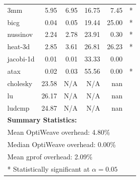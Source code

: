 \begin{table}[h]
\begin{tabular}{lrrrrl}
3mm                  &   5.95 &   6.95 &  16.75 &   7.45 & * \\
bicg                 &   0.04 &   0.05 &  19.44 &  25.00 & * \\
nussinov             &   2.24 &   2.78 &  23.91 &   0.30 & * \\
heat-3d              &   2.85 &   3.61 &  26.81 &  26.23 & * \\
jacobi-1d            &   0.01 &   0.01 &  33.33 &   0.00 &   \\
atax                 &   0.02 &   0.03 &  55.56 &   0.00 & * \\
cholesky             &  23.58 &    N/A &    N/A &    nan &   \\
lu                   &  26.17 &    N/A &    N/A &    nan &   \\
ludcmp               &  24.87 &    N/A &    N/A &    nan &   \\
\midrule
\multicolumn{6}{l}{\textbf{Summary Statistics:}} \\
\multicolumn{6}{l}{Mean OptiWeave overhead: 4.80\%} \\
\multicolumn{6}{l}{Median OptiWeave overhead: 0.00\%} \\
\multicolumn{6}{l}{Mean gprof overhead: 2.09\%} \\
\multicolumn{6}{l}{* Statistically significant at $\alpha=0.05$} \\
\bottomrule
\end{tabular}
\end{table}
